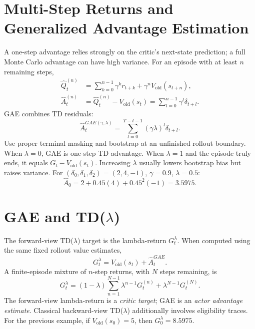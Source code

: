 \section{Multi-Step Returns and Generalized Advantage Estimation}
A one-step advantage relies strongly on the critic's next-state prediction; a full Monte Carlo advantage can have high variance. For an episode with at least $n$ remaining steps,
\begin{align}
\hat Q_t^{(n)}&=\sum_{k=0}^{n-1}\gamma^kr_{t+k}
+\gamma^n V_{\mathrm{old}}(s_{t+n}),\\
\hat A_t^{(n)}&=\hat Q_t^{(n)}-V_{\mathrm{old}}(s_t)
=\sum_{l=0}^{n-1}\gamma^l\delta_{t+l}.
\end{align}
GAE combines TD residuals:
\begin{equation}
\hat A_t^{GAE(\gamma,\lambda)}
=\sum_{l=0}^{T-t-1}(\gamma\lambda)^l\delta_{t+l}.
\end{equation}
Use proper terminal masking and bootstrap at an unfinished rollout boundary. When $\lambda=0$, GAE is one-step TD advantage. When $\lambda=1$ and the episode truly ends, it equals $G_t-V_{\mathrm{old}}(s_t)$. Increasing $\lambda$ usually lowers bootstrap bias but raises variance.
For $(\delta_0,\delta_1,\delta_2)=(2,4,-1)$, $\gamma=0.9$, $\lambda=0.5$:
\begin{equation}
\hat A_0=2+0.45(4)+0.45^2(-1)=3.5975.
\end{equation}

\section{GAE and TD($\lambda$)}
The forward-view TD($\lambda$) target is the lambda-return $G_t^\lambda$. When computed using the same fixed rollout value estimates,
\begin{equation}
G_t^\lambda=V_{\mathrm{old}}(s_t)+\hat A_t^{GAE}.
\end{equation}
A finite-episode mixture of $n$-step returns, with $N$ steps remaining, is
\begin{equation}
G_t^\lambda=(1-\lambda)\sum_{n=1}^{N-1}\lambda^{n-1}G_t^{(n)}
+\lambda^{N-1}G_t^{(N)}.
\end{equation}
The forward-view lambda-return is a \emph{critic target}; GAE is an \emph{actor advantage estimate}. Classical backward-view TD($\lambda$) additionally involves eligibility traces.
For the previous example, if $V_{\mathrm{old}}(s_0)=5$, then $G_0^\lambda=8.5975$.

